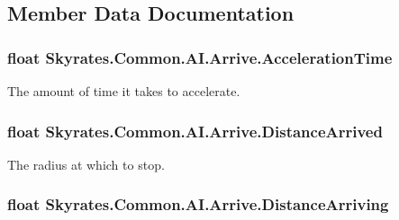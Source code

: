 \subsection{Member Data Documentation}
\hypertarget{class_skyrates_1_1_common_1_1_a_i_1_1_arrive_a7af8e494ae9c995e173e25e4af34f442}{
\subsubsection[{Acceleration\-Time}]{\setlength{\rightskip}{0pt plus 5cm}float Skyrates.\-Common.\-A\-I.\-Arrive.\-Acceleration\-Time}}\label{class_skyrates_1_1_common_1_1_a_i_1_1_arrive_a7af8e494ae9c995e173e25e4af34f442}


The amount of time it takes to accelerate. 

\hypertarget{class_skyrates_1_1_common_1_1_a_i_1_1_arrive_aed0ecb85d42852c1c08903a897241773}{
\subsubsection[{Distance\-Arrived}]{\setlength{\rightskip}{0pt plus 5cm}float Skyrates.\-Common.\-A\-I.\-Arrive.\-Distance\-Arrived}}\label{class_skyrates_1_1_common_1_1_a_i_1_1_arrive_aed0ecb85d42852c1c08903a897241773}


The radius at which to stop. 

\hypertarget{class_skyrates_1_1_common_1_1_a_i_1_1_arrive_a5e20a0f88fbed311dfa8df2f469f6c3f}{
\subsubsection[{Distance\-Arriving}]{\setlength{\rightskip}{0pt plus 5cm}float Skyrates.\-Common.\-A\-I.\-Arrive.\-Distance\-Arriving}}\label{class_skyrates_1_1_common_1_1_a_i_1_1_arrive_a5e20a0f88fbed311dfa8df2f469f6c3f}


